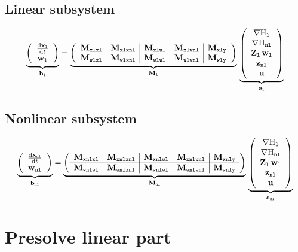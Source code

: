\documentclass[10pt,a4paper]{article}
\begin{document}
\subsection{Linear subsystem}
%
\begin{equation}
\underbrace{\left(\begin{array}{c}
\D{\vxl}{t}\\
\vwl
\end{array}\right)}_{\vec b_{\lab l}}
 = \underbrace{\left(\begin{array}{ll|ll|l}
\M{xlxl}&\M{xlxnl}&\M{xlwl} & \M{xlwnl} & \M{xly}\\ 
\M{wlxl}& \M{wlxnl}& \M{wlwl} & \M{wlwnl} & \M{wly}
\end{array}\right)}_{\M{l}}
\,
\underbrace{\left(\begin{array}{c}
\nabla\Hl\\
\nabla\Hnl\\
\mat{Z}_{\lab l}\,\vwl\\
\vznl\\
\vu
\end{array}\right) }_{\vec a_{\lab{l}}}
\end{equation}
%
\subsection{Nonlinear subsystem}
%
\begin{equation}
\underbrace{\left(\begin{array}{c}
\D{\vxnl}{t}\\
\vwnl
\end{array}\right)}_{\vec b_{\lab{nl}}}
 = \underbrace{\left(\begin{array}{ll|ll|l}
\M{xnlxl}&\M{xnlxnl}&\M{xnlwl} &  \M{xnlwnl} & \M{xnly}\\ \hline
\M{wnlwl}& \M{wnlxnl}& \M{wnlwl} & \M{wnlwnl} & \M{wnly}
\end{array}\right)}_{\M{nl}}
\,
\underbrace{\left(\begin{array}{c}
\nabla\Hl\\
\nabla\Hnl\\
\mat{Z}_{\lab l}\,\vwl\\
\vznl\\
\vu
\end{array}\right) }_{\vec a_{\lab{nl}}}
\end{equation}
%
\section{Presolve linear part}
%
\end{document}
